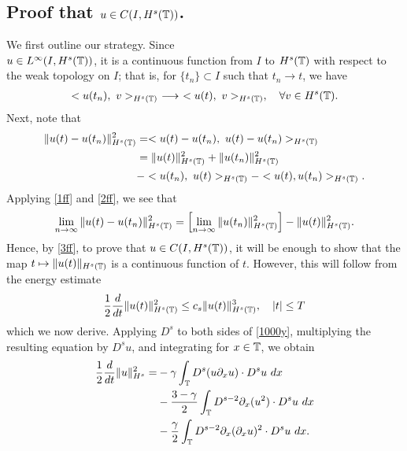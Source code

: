 \subsection{ Proof that $u \in C(I, H^s(\mathbb{T}))$.} 
We first outline our strategy. Since \\
$u \in L^\infty(I, H^s(\mathbb{T}))$, it is a
continuous function from $I$ to $H^s(\mathbb{T})$ with respect to the weak
topology on $I$; that is, for $\{t_n\} \subset I$ such that $t_n \to t$, we
have
\begin{equation}
	\begin{split}
		<u(t_n), \ v>_{H^s(\mathbb{T})} \ \longrightarrow \
		<u(t), \ v>_{H^s(\mathbb{T})}, \quad \forall
		v \in H^s(\mathbb{T}).
		\label{1ff}
	\end{split}
\end{equation}
Next, note that
\begin{equation}
	\begin{split}
		\|u(t) - u(t_n) \|_{H^s(\mathbb{T})}^2
		& = <u(t) - u(t_n), \ u(t) -
		u(t_n)>_{H^s(\mathbb{T})}
		\\
		& = \|u(t)\|_{H^s(\mathbb{T})}^2 + \|u(t_n)\|_{H^s(\mathbb{T})}^2
		\\
		& - <u(t_n), \
		u(t) >_{H^s(\mathbb{T})} - <u(t), u(t_n)>_{H^s(\mathbb{T})}.
		\label{2ff}
	\end{split}
\end{equation}
Applying \eqref{1ff} and \eqref{2ff}, we see that
\begin{equation}
	\begin{split}
		\lim_{n \to \infty} \|u(t) - u(t_n)\|_{H^s(\mathbb{T})}^2 = \left[ \lim_{n
		\to \infty} \|u(t_n)\|_{H^s(\mathbb{T})}^2
		\right] - \|u(t)\|_{H^s(\mathbb{T})}^2.
		\label{3ff}
	\end{split}
\end{equation}
Hence, by \eqref{3ff}, to prove that $u \in C(I, H^s(\mathbb{T}))$, it will be
enough to show that the map $t \mapsto \|u(t)\|_{H^s(\mathbb{T})}$ is a continuous
function of $t$. However, this will follow from the energy
estimate
		\begin{equation}
			\label{en-est-u}
			\frac{1}{2} \frac{d}{dt} \|u(t)\|_{H^s(\mathbb{T})}^2
			\le c_s \|u(t)\|_{H^s(\mathbb{T})}^3, \quad |t| \le T
		\end{equation}
		which we now derive. Applying $D^s$ to both sides of
		\eqref{1000y}, multiplying the
		resulting equation by $D^s u$, and integrating for $x\in \mathbb{T}$, we obtain
		\begin{equation}
			\begin{split}
				\label{bound-int}
				\frac 12
				\frac{d}{dt} \|u \|_{H^s}^2
				=
				&-
				\gamma \int_{\mathbb{T}}   D^s (u \partial_x u) \cdot
				D^s u \  dx
				\\
				&- \frac{3 -\gamma}{2} \int_{\mathbb{T}}  D^{s-2} \partial_x (u^2) 
				\cdot D^s u \ dx
				\\
				&- \frac{\gamma}{2} \int_{\mathbb{T}}   D^{s-2} \partial_x (\partial_x u)^2
				\cdot D^s u \ dx.
			\end{split}
		\end{equation}
